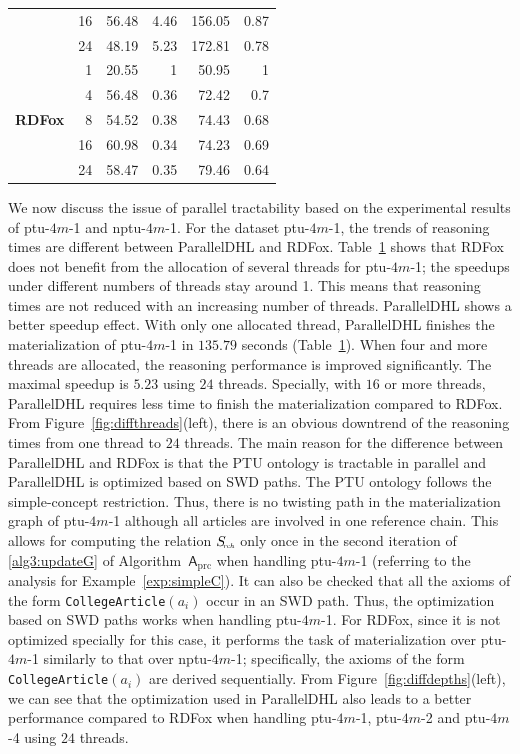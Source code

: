 \begin{table}
\begin{tabular}{|l|r|r|r|r|r|}
                                &16&56.48&4.46&156.05&0.87\\
                                &24&48.19&5.23&172.81&0.78\\
\hline
\multirow{5}{*}{ \textbf{RDFox}}&1&20.55&1&50.95&1\\
                                &4&56.48&0.36&72.42&0.7\\
                                &8&54.52&0.38&74.43&0.68\\
                                &16&60.98&0.34&74.23&0.69\\
                                &24&58.47&0.35&79.46&0.64\\
\hline
\end{tabular}
\label{tab:speedup}
\end{table}

We now discuss the issue of parallel tractability based on the experimental
results of ptu-$4m$-1 and nptu-$4m$-1.
For the dataset ptu-$4m$-1, the trends of reasoning times are different
between ParallelDHL and RDFox.
Table~\ref{tab:speedup} shows that
RDFox does not benefit from the allocation of several threads for ptu-$4m$-1;
the speedups under different numbers of threads stay around 1.
This means that reasoning times are not reduced with an increasing number of threads.
ParallelDHL shows a better speedup effect. With only one allocated thread, ParallelDHL finishes
the materialization of ptu-$4m$-1 in $135.79$ seconds (Table~\ref{tab:speedup}). When four and more threads
are allocated, the reasoning performance is improved significantly.
The maximal speedup is $5.23$ using $24$ threads.
Specially, with $16$ or more threads, ParallelDHL
requires less time to finish the materialization compared to RDFox.
From Figure~\ref{fig:diffthreads}(left), there is an obvious downtrend of the reasoning times
from one thread to $24$ threads.
The main reason for the difference between ParallelDHL and RDFox
is that the PTU ontology is tractable in parallel and ParallelDHL
is optimized based on SWD paths. The PTU ontology follows the
simple-concept restriction. Thus, there is no twisting path in
the materialization graph of ptu-$4m$-1 although all articles are involved
in one reference chain. This allows for computing the relation $S_{\textit{\!\tiny
    rch}}$ only once in the second iteration of \ref{alg3:updateG} of Algorithm~$\mathsf{A}_{\text{prc}}$
when handling ptu-$4m$-1 (referring to the analysis for Example~\ref{exp:simpleC}).
It can also be checked that all the axioms of the form \texttt{CollegeArticle}$(a_i)$ occur in
an SWD path. Thus, the optimization based on SWD paths works when handling ptu-$4m$-1.
For RDFox, since it is not optimized specially for this case, it performs the task of
materialization over ptu-$4m$-1 similarly to that over nptu-$4m$-1;
specifically, the axioms of the form \texttt{CollegeArticle}$(a_i)$ are derived sequentially.
From Figure~\ref{fig:diffdepths}(left), we can see that the optimization used in ParallelDHL
also leads to a better performance compared to
RDFox when handling ptu-$4m$-1, ptu-$4m$-2 and ptu-$4m$-4 using $24$ threads.

